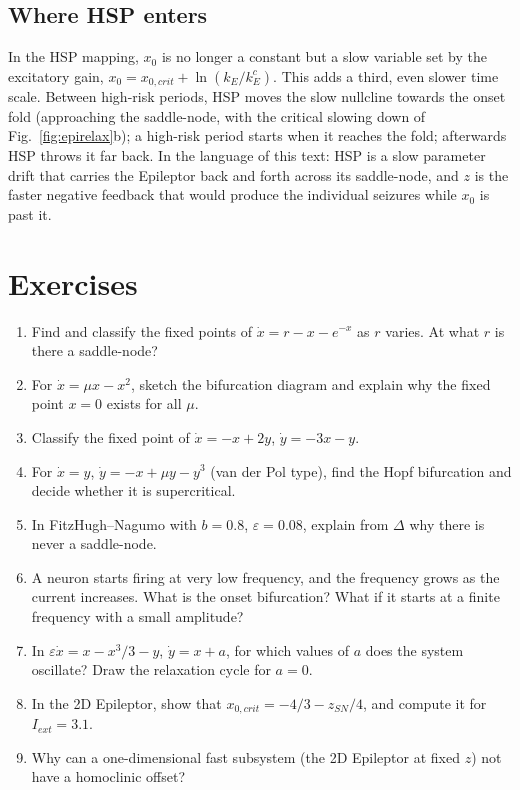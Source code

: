 \documentclass[11pt,openany]{report}
\newcommand{\eps}{\varepsilon}
\begin{document}
\section{Where HSP enters}
In the HSP mapping, $x_0$ is no longer a constant but a slow variable set by the excitatory gain,
$x_0 = x_{0,crit} + \ln(k_E/k_E^c)$. This adds a third, even slower time scale. Between high-risk periods, HSP moves the
slow nullcline towards the onset fold (approaching the saddle-node, with the critical slowing down of
Fig.~\ref{fig:epirelax}b); a high-risk period starts when it reaches the fold; afterwards HSP throws it far back. In the
language of this text: HSP is a slow parameter drift that carries the Epileptor back and forth across its saddle-node,
and $z$ is the faster negative feedback that would produce the individual seizures while $x_0$ is past it.

\appendix
\chapter{Exercises}
\begin{enumerate}[label=\textbf{\arabic*.}]
\item Find and classify the fixed points of $\dot x = r - x - e^{-x}$ as $r$ varies. At what $r$ is there a saddle-node?
\item For $\dot x = \mu x - x^2$, sketch the bifurcation diagram and explain why the fixed point $x=0$ exists for all
$\mu$.
\item Classify the fixed point of $\dot x = -x + 2y$, $\dot y = -3x - y$.
\item For $\dot x = y$, $\dot y = -x + \mu y - y^3$ (van der Pol type), find the Hopf bifurcation and decide whether it
is supercritical.
\item In FitzHugh--Nagumo with $b=0.8$, $\eps=0.08$, explain from $\Delta$ why there is never a saddle-node.
\item A neuron starts firing at very low frequency, and the frequency grows as the current increases. What is the onset
bifurcation? What if it starts at a finite frequency with a small amplitude?
\item In $\eps\dot x = x - x^3/3 - y$, $\dot y = x + a$, for which values of $a$ does the system oscillate? Draw the
relaxation cycle for $a=0$.
\item In the 2D Epileptor, show that $x_{0,crit} = -4/3 - z_{SN}/4$, and compute it for $I_{ext}=3.1$.
\item Why can a one-dimensional fast subsystem (the 2D Epileptor at fixed $z$) not have a homoclinic offset?
\end{enumerate}
\end{document}
